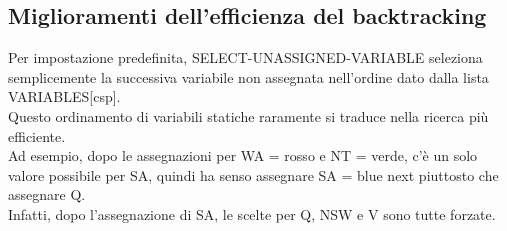 \subsection{Miglioramenti dell’efficienza del backtracking}
Per impostazione predefinita, SELECT-UNASSIGNED-VARIABLE seleziona semplicemente la successiva variabile non assegnata nell’ordine dato dalla lista VARIABLES[csp]. 
\\Questo ordinamento di variabili statiche raramente si traduce nella ricerca più efficiente. 
\\Ad esempio, dopo le assegnazioni per WA = rosso e NT = verde, c’è un solo valore possibile per SA, quindi ha senso assegnare SA = blue next piuttosto che assegnare Q.
\\ Infatti, dopo l’assegnazione di SA, le scelte per Q, NSW e V sono tutte forzate.

